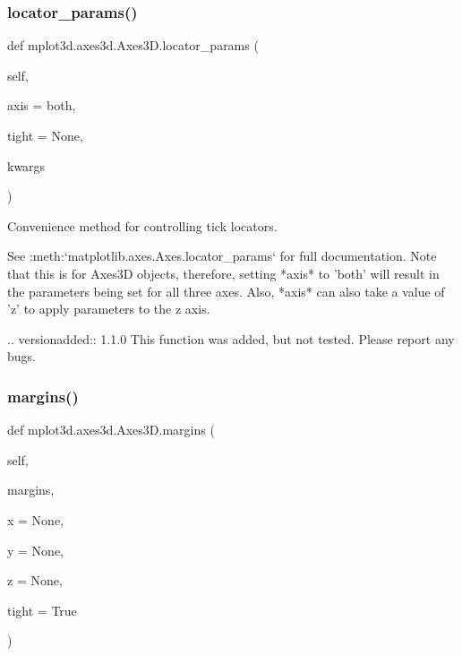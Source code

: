 \begin{DoxyVerb}
\subsubsection{\texorpdfstring{locator\+\_\+params()}{locator\_params()}}
{\footnotesize\ttfamily def mplot3d.\+axes3d.\+Axes3\+D.\+locator\+\_\+params (\begin{DoxyParamCaption}\item[{}]{self,  }\item[{}]{axis = {\ttfamily \textquotesingle{}both\textquotesingle{}},  }\item[{}]{tight = {\ttfamily None},  }\item[{}]{kwargs }\end{DoxyParamCaption})}

\begin{DoxyVerb}Convenience method for controlling tick locators.

See :meth:`matplotlib.axes.Axes.locator_params` for full
documentation.  Note that this is for Axes3D objects,
therefore, setting *axis* to 'both' will result in the
parameters being set for all three axes.  Also, *axis*
can also take a value of 'z' to apply parameters to the
z axis.

.. versionadded:: 1.1.0
    This function was added, but not tested. Please report any bugs.
\end{DoxyVerb}
 \mbox{\label{classmplot3d_1_1axes3d_1_1Axes3D_ad84e279cb2e75c08faf5589632b93769}} 
\subsubsection{\texorpdfstring{margins()}{margins()}}
{\footnotesize\ttfamily def mplot3d.\+axes3d.\+Axes3\+D.\+margins (\begin{DoxyParamCaption}\item[{}]{self,  }\item[{}]{margins,  }\item[{}]{x = {\ttfamily None},  }\item[{}]{y = {\ttfamily None},  }\item[{}]{z = {\ttfamily None},  }\item[{}]{tight = {\ttfamily True} }\end{DoxyParamCaption})}


\end{DoxyVerb}
